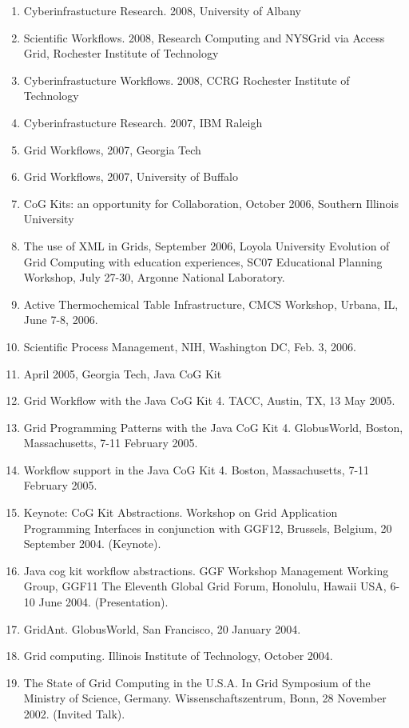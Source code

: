 \documentclass{article}
\begin{document}
\begin{enumerate}
\item  Cyberinfrastucture Research. 2008, University of Albany 
\item  Scientific Workflows. 2008, Research Computing and NYSGrid via Access Grid, Rochester Institute of Technology 
\item  Cyberinfrastucture Workflows. 2008, CCRG Rochester Institute of Technology 
\item  Cyberinfrastucture Research. 2007, IBM Raleigh 
\item  Grid Workflows, 2007, Georgia Tech
\item  Grid Workflows, 2007, University of Buffalo
\item  CoG Kits: an opportunity for Collaboration, October 2006, Southern Illinois University  
\item  The use of XML in Grids, September 2006, Loyola University Evolution of Grid Computing with education experiences, SC07 Educational Planning Workshop, July  27-30, Argonne National Laboratory. 
\item  Active Thermochemical Table Infrastructure, CMCS Workshop, Urbana, IL, June 7-8, 2006. 
\item  Scientific Process Management, NIH, Washington DC, Feb. 3, 2006. 
\item  April 2005, Georgia Tech, Java CoG Kit 
\item  Grid Workflow with the Java CoG Kit 4. TACC, Austin, TX, 13 May 2005. 
\item  Grid Programming Patterns with the Java CoG Kit 4. GlobusWorld, Boston, Massachusetts, 7-11 February 2005. 
\item  Workflow support in the Java CoG Kit 4. Boston, Massachusetts, 7-11 February 2005. 
\item  Keynote: CoG Kit Abstractions. Workshop on Grid Application Programming Interfaces in conjunction with GGF12, Brussels, Belgium, 20 September 2004. (Keynote). %
\item  Java cog kit workflow abstractions. GGF Workshop Management Working Group, GGF11 The Eleventh Global Grid Forum, Honolulu, Hawaii USA, 6-10 June 2004. (Presentation). 
\item  GridAnt. GlobusWorld, San Francisco, 20 January 2004. 
\item  Grid computing. Illinois Institute of Technology, October 2004. 
\item  The State of Grid Computing in the U.S.A. In Grid Symposium of the Ministry of Science, Germany. Wissenschaftszentrum, Bonn, 28 November 2002. (Invited Talk). 

\end{enumerate}
\end{document}
